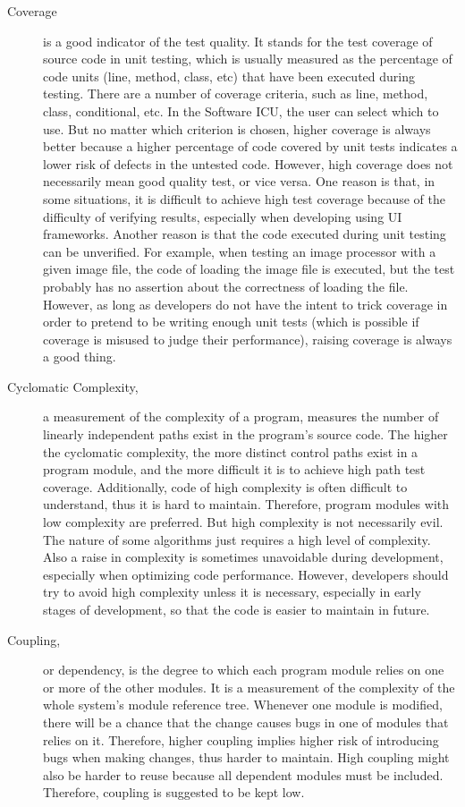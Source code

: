 \begin{description}
\item[Coverage] 
is a good indicator of the test quality. It stands for the test coverage of source code in unit testing, which is usually measured as the percentage of code units (line, method, class, etc) that have been executed during testing. There are a number of coverage criteria, such as line, method, class, conditional, etc. In the Software ICU, the user can select which to use. But no matter which criterion is chosen, higher coverage is always better because a higher percentage of code covered by unit tests indicates a lower risk of defects in the untested code. However, high coverage does not necessarily mean good quality test, or vice versa. One reason is that, in some situations, it is difficult to achieve high test coverage because of the difficulty of verifying results, especially when developing using UI frameworks. Another reason is that the code executed during unit testing can be unverified. For example, when testing an image processor with a given image file, the code of loading the image file is executed, but the test probably has no assertion about the correctness of loading the file. However, as long as developers do not have the intent to trick coverage in order to pretend to be writing enough unit tests (which is possible if coverage is misused to judge their performance), raising coverage is always a good thing.

\item[Cyclomatic Complexity,] a measurement of the complexity of a program, measures the number of linearly independent paths exist in the program's source code\cite{mccabe:complexity}. The higher the cyclomatic complexity, the more distinct control paths exist in a program module, and the more difficult it is to achieve high path test coverage. Additionally, code of high complexity is often difficult to understand, thus it is hard to maintain. Therefore, program modules  with low complexity are preferred. But high complexity is not necessarily evil. The nature of some algorithms just requires a high level of complexity. Also a raise in complexity is sometimes unavoidable during development, especially when optimizing code performance. However, developers should try to avoid high complexity unless it is necessary, especially in early stages of development, so that the code is easier to maintain in future.

\item[Coupling,] or dependency, is the degree to which each program module relies on one or more of the other modules. It is a measurement of the complexity of the whole system's module reference tree. Whenever one module is modified, there will be a chance that the change causes bugs in one of modules that relies on it. Therefore, higher coupling implies higher risk of introducing bugs when making changes, thus harder to maintain. High coupling might also be harder to reuse because all dependent modules must be included. Therefore, coupling is suggested to be kept low.


\end{description}
